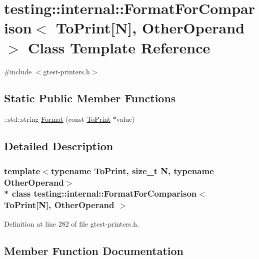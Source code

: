 \hypertarget{classtesting_1_1internal_1_1_format_for_comparison_3_01_to_print[_n]_00_01_other_operand_01_4}{}\section{testing\+:\+:internal\+:\+:Format\+For\+Comparison$<$ To\+Print\mbox{[}N\mbox{]}, Other\+Operand $>$ Class Template Reference}
\label{classtesting_1_1internal_1_1_format_for_comparison_3_01_to_print[_n]_00_01_other_operand_01_4}


{\ttfamily \#include $<$gtest-\/printers.\+h$>$}

\subsection*{Static Public Member Functions}
\begin{DoxyCompactItemize}
\item 
\+::std\+::string \hyperlink{classtesting_1_1internal_1_1_format_for_comparison_3_01_to_print[_n]_00_01_other_operand_01_4_a76c526461c8fa7df75f7b32ab889b9e0}{Format} (const \hyperlink{classes__6_8js_ad81a47989c7025eaa75cb3cd6c05ca66}{To\+Print} $\ast$value)
\end{DoxyCompactItemize}


\subsection{Detailed Description}
\subsubsection*{template$<$typename To\+Print, size\+\_\+t N, typename Other\+Operand$>$\\*
class testing\+::internal\+::\+Format\+For\+Comparison$<$ To\+Print\mbox{[}\+N\mbox{]}, Other\+Operand $>$}



Definition at line 282 of file gtest-\/printers.\+h.



\subsection{Member Function Documentation}
